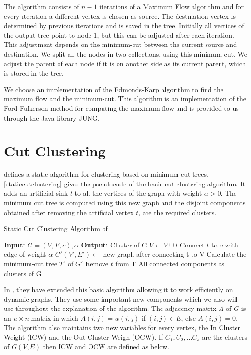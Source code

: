 The algorithm consists of $n-1$ iterations of a Maximum Flow algorithm and for every iteration a different vertex is chosen as source. The destination vertex is determined by previous iterations and is saved in the tree. Initially all vertices of the output tree point to node 1, but this can be adjusted after each iteration. This adjustment depends on the minimum-cut between the current source and destination. We split all the nodes in two collections, using this minimum-cut. We adjust the parent of each node if it is on another side as its current parent, which is stored in the tree.

We choose an implementation of the Edmonds-Karp algorithm to find the maximum flow and the minimum-cut. This algorithm is an implementation of the Ford-Fulkerson method for computing the maximum flow and is provided to us through the Java library JUNG.

\section{Cut Clustering}

\cite{flake2004graph} defines a static algorithm for clustering based on minimum cut trees. \autoref{staticcutclustering} gives the pseudocode of the basic cut clustering algorithm. It adds an artificial sink $t$ to all the vertices of the graph with weight $\alpha > 0$. The minimum cut tree is computed using this new graph and the disjoint components obtained after removing the artificial vertex $t$, are the required clusters.

\begin{algorithm}
\caption{Static Cut Clustering Algorithm of \cite{flake2004graph}}
\label{staticcutclustering}
\begin{algorithmic}
\STATE \textbf{Input:} $G = (V,E,c), \alpha$ 
\STATE \textbf{Output:} Cluster of G
\STATE $V \leftarrow V \cup t$
	\STATE Connect $t$ to $v$ with edge of weight $\alpha$
\ENDFOR
\STATE $G'(V',E') \leftarrow$ new graph after connecting t to V
\STATE Calculate the minimum-cut tree $T'$ of $G'$
\STATE Remove $t$ from T
\RETURN All connected components as clusters of G
\end{algorithmic}
\end{algorithm}

In \cite{saha2006dynamic}, they have extended this basic algorithm allowing it to work efficiently on dynamic graphs. They use some important new components which we also will use throughout the explanation of the algorithm. The adjacency matrix $A$ of $G$ is an $n \times n$ matrix in which $A(i,j) = w(i,j)$ if $(i,j) \in E$, else $A(i,j) = 0$. The algorithm also maintains two new variables for every vertex, the In Cluster Weight (ICW) and the Out Cluster Weigh (OCW). If $C_1,C_2,...C_s$ are the clusters of $G(V,E)$ then ICW and OCW are defined as below.

